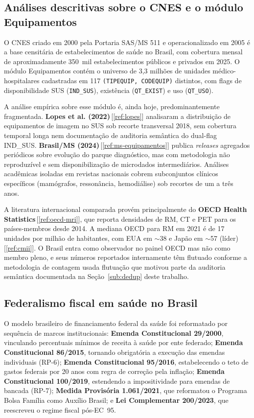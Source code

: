 \documentclass[12pt,a4paper,oneside]{article}
\begin{document}
\subsection{Análises descritivas sobre o CNES e o módulo
Equipamentos}\label{sub:lit-cnes}

O CNES \textendash{} criado em 2000 pela Portaria SAS/MS 511 e
operacionalizado em 2005 \textendash{} é a base censitária de
estabelecimentos de saúde no Brasil, com cobertura mensal de
aproximadamente 350~mil estabelecimentos públicos e privados em
2025. O módulo Equipamentos contém o universo de 3,3 milhões de
unidades médico-hospitalares cadastradas em 117
\texttt{(TIPEQUIP, CODEQUIP)} distintos, com flags de
disponibilidade SUS (\texttt{IND\_SUS}), existência (\texttt{QT\_EXIST})
e uso (\texttt{QT\_USO}).

A análise empírica sobre esse módulo é, ainda hoje,
predominantemente fragmentada. \textbf{Lopes et al. (2022)}\,[\ref{ref:lopes}]
analisaram a distribuição de equipamentos de imagem no SUS sob
recorte transversal 2018, sem cobertura temporal longa nem
documentação de auditoria semântica do dual-flag IND\_SUS.
\textbf{Brasil/MS (2024)}\,[\ref{ref:ms-equipamentos}] publica
\textit{releases} agregados periódicos sobre evolução do parque
diagnóstico, mas com metodologia não reproduzível e sem
disponibilização de microdados intermediários. Análises acadêmicas
isoladas em revistas nacionais cobrem subconjuntos clínicos
específicos (mamógrafos, ressonância, hemodiálise) sob recortes de
um a três anos.

A literatura internacional comparada provém principalmente do
\textbf{OECD Health Statistics}\,[\ref{ref:oecd-mri}], que reporta
densidades de RM, CT e PET para os países-membros desde 2014. A
mediana OECD para RM em 2021 é de 17 unidades por milhão de
habitantes, com EUA em $\sim$38 e Japão em $\sim$57 (líder)
\,[\ref{ref:cmii}]. O Brasil entra como observador no painel OECD
mas não como membro pleno, e seus números reportados internamente
têm flutuado conforme a metodologia de contagem usada
\textemdash{} flutuação que motivou parte da auditoria semântica
documentada na Seção~\ref{sub:dedup} deste trabalho.

\subsection{Federalismo fiscal em saúde no
Brasil}\label{sub:lit-federalismo}

O modelo brasileiro de financiamento federal da saúde foi reformatado
por sequência de marcos institucionais: \textbf{Emenda Constitucional
29/2000}, vinculando percentuais mínimos de receita à saúde por ente
federado; \textbf{Emenda Constitucional 86/2015}, tornando obrigatória
a execução das emendas individuais (RP-6); \textbf{Emenda
Constitucional 95/2016}, estabelecendo o teto de gastos federais
por 20 anos com regra de correção pela inflação;
\textbf{Emenda Constitucional 100/2019}, estendendo a impositividade
para emendas de bancada (RP-7); \textbf{Medida Provisória 1.061/2021},
que reformatou o Programa Bolsa Família como Auxílio Brasil; e
\textbf{Lei Complementar 200/2023}, que reescreveu o regime fiscal
pós-EC~95.
\end{document}
